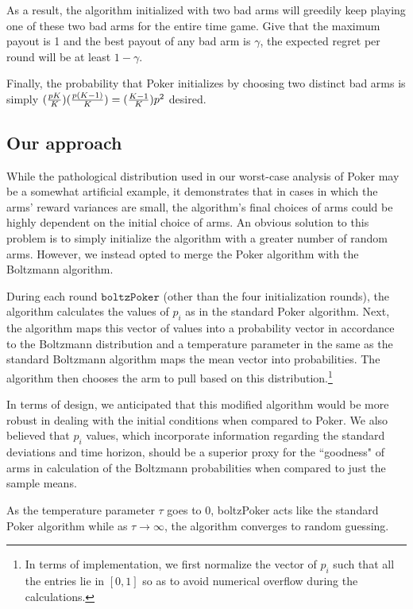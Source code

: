 \documentclass[12pt]{article}
\begin{document}
As a result, the algorithm initialized with two bad arms will greedily keep playing one of these two bad arms for the entire time game. Give that the maximum payout is 1 and the best payout of any bad arm is $\gamma$, the expected regret per round will be at least $1-\gamma$. 

Finally, the probability that Poker initializes by choosing two distinct bad arms is simply $({pK\over{K}})({p(K-1)\over{K}}) = ({K-1\over K})p^{2}$ desired.

\subsection{Our approach}

While the pathological distribution used in our worst-case analysis of Poker may be a somewhat artificial example, it demonstrates that in cases in which the arms' reward variances are small, the algorithm's final choices of arms could be highly dependent  on the initial choice of arms. An obvious solution to this problem is to simply initialize the algorithm with a greater number of random arms. However, we instead opted to merge the Poker algorithm with the Boltzmann algorithm.

During each round $\texttt{boltzPoker}$ (other than the four initialization rounds), the algorithm calculates the values of $p_{i}$ as in the standard Poker algorithm. Next, the algorithm maps this vector of values into a probability vector in accordance to the Boltzmann distribution and a temperature parameter in the same as the standard Boltzmann algorithm maps the mean vector into probabilities. The algorithm then chooses the arm to pull based on this distribution.\footnote{In terms of implementation, we first normalize the vector of $p_{i}$ such that all the entries lie in $[0,1]$ so as to avoid numerical overflow during the calculations.}

In terms of design, we anticipated that this modified algorithm would be more robust in dealing with the initial conditions when compared to Poker. We also believed that $p_{i}$ values, which incorporate information regarding the standard deviations and time horizon, should be a superior proxy for the ``goodness" of arms in calculation of the Boltzmann probabilities when compared to just the sample means.

As the temperature parameter $\tau$ goes to 0, boltzPoker acts like the standard Poker algorithm while as $\tau \to \infty$, the algorithm converges to random guessing.
\end{document}
